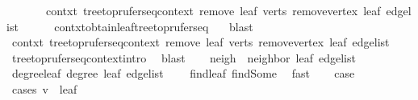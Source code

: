 \begin{isabellebody}
\ \ \ \ \ \ \ contxt{\isacharprime}{\kern0pt}{\isacharcolon}{\kern0pt}\ {\isachardoublequoteopen}tree{\isacharunderscore}{\kern0pt}to{\isacharunderscore}{\kern0pt}prufer{\isacharunderscore}{\kern0pt}seq{\isacharunderscore}{\kern0pt}context\ {\isacharparenleft}{\kern0pt}remove{}\ leaf\ verts{\isacharparenright}{\kern0pt}\ {\isacharparenleft}{\kern0pt}remove{\isacharunderscore}{\kern0pt}vertex\ leaf\ {\isacharquery}{\kern0pt}edge{\isacharunderscore}{\kern0pt}list{\isacharparenright}{\kern0pt}{\isachardoublequoteclose}\isanewline
\ \ \ \ \isamarkupfalse%
\ contxt{\isachardot}{\kern0pt}obtain{\isacharunderscore}{\kern0pt}leaf{\isacharunderscore}{\kern0pt}tree{\isacharunderscore}{\kern0pt}to{\isacharunderscore}{\kern0pt}prufer{\isacharunderscore}{\kern0pt}seq\ {}\ \isamarkupfalse%
\ blast\isanewline
\ \ \isamarkupfalse%
\ \isamarkupfalse%
\ contxt{\isacharprime}{\kern0pt}{\isacharcolon}{\kern0pt}\ tree{\isacharunderscore}{\kern0pt}to{\isacharunderscore}{\kern0pt}prufer{\isacharunderscore}{\kern0pt}seq{\isacharunderscore}{\kern0pt}context\ {\isachardoublequoteopen}remove{}\ leaf\ verts{\isachardoublequoteclose}\ {\isachardoublequoteopen}remove{\isacharunderscore}{\kern0pt}vertex\ leaf\ {\isacharquery}{\kern0pt}edge{\isacharunderscore}{\kern0pt}list{\isachardoublequoteclose}\ \isamarkupfalse%
\ tree{\isacharunderscore}{\kern0pt}to{\isacharunderscore}{\kern0pt}prufer{\isacharunderscore}{\kern0pt}seq{\isacharunderscore}{\kern0pt}context{\isachardot}{\kern0pt}intro\ \isamarkupfalse%
\ blast\isanewline
\ \ \isamarkupfalse%
\ {\isacharquery}{\kern0pt}neigh\ {\isacharequal}{\kern0pt}\ {\isachardoublequoteopen}neighbor\ leaf\ {\isacharquery}{\kern0pt}edge{\isacharunderscore}{\kern0pt}list{\isachardoublequoteclose}\isanewline
\ \ \isamarkupfalse%
\ degree{\isacharunderscore}{\kern0pt}leaf{\isacharcolon}{\kern0pt}\ {\isachardoublequoteopen}degree\ leaf\ {\isacharquery}{\kern0pt}edge{\isacharunderscore}{\kern0pt}list\ {\isacharequal}{\kern0pt}\ {}{\isachardoublequoteclose}\ \isamarkupfalse%
\ find{\isacharunderscore}{\kern0pt}leaf\ find{\isacharunderscore}{\kern0pt}Some\ \isamarkupfalse%
\ fast\isanewline
\ \ \isamarkupfalse%
\ {\isacharquery}{\kern0pt}case\isanewline
\ \ \isamarkupfalse%
\ {\isacharparenleft}{\kern0pt}cases\ {\isachardoublequoteopen}v\ {\isacharequal}{\kern0pt}\ leaf{\isachardoublequoteclose}{\isacharparenright}{\kern0pt}\isanewline

\end{isabellebody}
